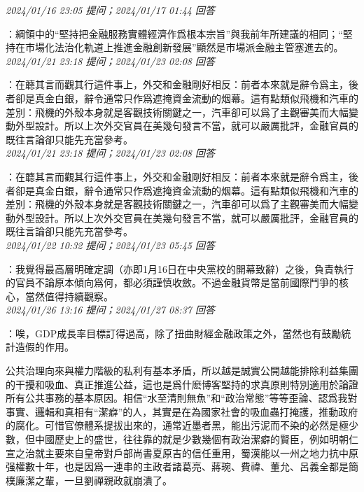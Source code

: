 \documentclass[twocolumn]{ctexart}
\begin{document}
\textit{\hfill\noindent\small 2024/01/16 23:05 提问；2024/01/17 01:44 回答}

：綱領中的“堅持把金融服務實體經濟作爲根本宗旨”與我前年所建議的相同；“堅持在市場化法治化軌道上推進金融創新發展”顯然是市場派金融主管塞進去的。
\\

\textit{\hfill\noindent\small 2024/01/21 23:18 提问；2024/01/23 02:08 回答}

：在聼其言而觀其行這件事上，外交和金融剛好相反：前者本來就是辭令爲主，後者卻是真金白銀，辭令通常只作爲遮掩資金流動的烟幕。這有點類似飛機和汽車的差別：飛機的外殼本身就是客觀技術關鍵之一，汽車卻可以爲了主觀審美而大幅變動外型設計。所以上次外交官員在美幾句發言不當，就可以嚴厲批評，金融官員的既往言論卻只能先充當參考。
\\

\textit{\hfill\noindent\small 2024/01/21 23:18 提问；2024/01/23 02:08 回答}

：在聼其言而觀其行這件事上，外交和金融剛好相反：前者本來就是辭令爲主，後者卻是真金白銀，辭令通常只作爲遮掩資金流動的烟幕。這有點類似飛機和汽車的差別：飛機的外殼本身就是客觀技術關鍵之一，汽車卻可以爲了主觀審美而大幅變動外型設計。所以上次外交官員在美幾句發言不當，就可以嚴厲批評，金融官員的既往言論卻只能先充當參考。
\\

\textit{\hfill\noindent\small 2024/01/22 10:32 提问；2024/01/23 05:45 回答}

：我覺得最高層明確定調（亦即1月16日在中央黨校的開幕致辭）之後，負責執行的官員不論原本傾向爲何，都必須謹慎收斂。不過金融貨幣是當前國際鬥爭的核心，當然值得持續觀察。
\\

\textit{\hfill\noindent\small 2024/01/26 13:16 提问；2024/01/27 08:37 回答}

：唉，GDP成長率目標訂得過高，除了扭曲財經金融政策之外，當然也有鼓勵統計造假的作用。

公共治理向來與權力階級的私利有基本矛盾，所以越是誠實公開越能排除利益集團的干擾和吸血、真正推進公益，這也是爲什麽博客堅持的求真原則特別適用於論證所有公共事務的基本原因。相信“水至清則無魚”和“政治常態”等等歪論、認爲我對事實、邏輯和真相有“潔癖”的人，其實是在為國家社會的吸血蟲打掩護，推動政府的腐化。可惜官僚體系提拔出來的，通常近墨者黑，能出污泥而不染的必然是極少數，但中國歷史上的盛世，往往靠的就是少數幾個有政治潔癖的賢臣，例如明朝仁宣之治就主要來自皇帝對戶部尚書夏原吉的信任重用，蜀漢能以一州之地力抗中原强權數十年，也是因爲一連串的主政者諸葛亮、蔣琬、費禕、董允、呂義全都是簡樸廉潔之輩，一旦劉禪親政就崩潰了。
\end{document}

